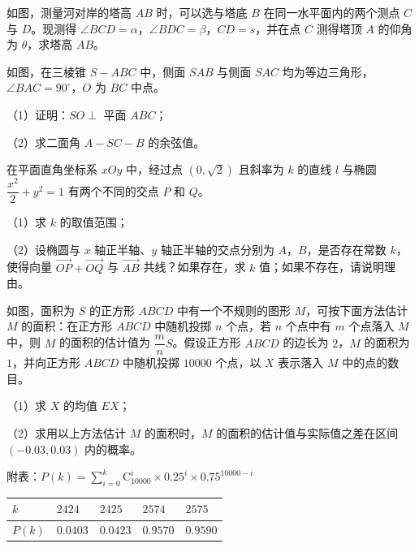 \Needspace{0.4\textheight}
\begin{question}
如图，测量河对岸的塔高 $AB$ 时，可以选与塔底 $B$ 在同一水平面内的两个测点 $C$ 与 $D$。现测得 $\angle BCD=\alpha$，$\angle BDC=\beta$，$CD=s$，并在点 $C$ 测得塔顶 $A$ 的仰角为 $\theta$，求塔高 $AB$。
\nopagebreak[4]
\begin{center}\end{center}
\nopagebreak[4]
\Needspace{0.4\textheight}
\end{question}
\begin{question}
如图，在三棱锥 $S-ABC$ 中，侧面 $SAB$ 与侧面 $SAC$ 均为等边三角形，$\angle BAC=90^\circ$，$O$ 为 $BC$ 中点。

（1）证明：$SO\perp$ 平面 $ABC$；

（2）求二面角 $A-SC-B$ 的余弦值。
\nopagebreak[4]
\begin{center}\end{center}
\nopagebreak[4]
\end{question}
\begin{question}
在平面直角坐标系 $xOy$ 中，经过点 $(0,\sqrt2)$ 且斜率为 $k$ 的直线 $l$ 与椭圆 $\dfrac{x^2}{2}+y^2=1$ 有两个不同的交点 $P$ 和 $Q$。

（1）求 $k$ 的取值范围；

（2）设椭圆与 $x$ 轴正半轴、$y$ 轴正半轴的交点分别为 $A$，$B$，是否存在常数 $k$，使得向量 $\overrightarrow{OP}+\overrightarrow{OQ}$ 与 $\overrightarrow{AB}$ 共线？如果存在，求 $k$ 值；如果不存在，请说明理由。

\Needspace{0.4\textheight}
\end{question}
\begin{question}
如图，面积为 $S$ 的正方形 $ABCD$ 中有一个不规则的图形 $M$，可按下面方法估计 $M$ 的面积：在正方形 $ABCD$ 中随机投掷 $n$ 个点，若 $n$ 个点中有 $m$ 个点落入 $M$ 中，则 $M$ 的面积的估计值为 $\dfrac mnS$。假设正方形 $ABCD$ 的边长为 $2$，$M$ 的面积为 $1$，并向正方形 $ABCD$ 中随机投掷 $10000$ 个点，以 $X$ 表示落入 $M$ 中的点的数目。

（1）求 $X$ 的均值 $EX$；

（2）求用以上方法估计 $M$ 的面积时，$M$ 的面积的估计值与实际值之差在区间 $(-0.03,\allowbreak 0.03)$ 内的概率。

附表：$P(k)=\sum\limits_{i=0}^{k}\mathrm C_{10000}^i\times0.25^i\times0.75^{10000-i}$

\begin{center}
\begin{tabular}{lllll}
\toprule
$k$ & $2424$ & $2425$ & $2574$ & $2575$ \\
\midrule
$P(k)$ & $0.0403$ & $0.0423$ & $0.9570$ & $0.9590$ \\
\bottomrule
\end{tabular}
\end{center}
\nopagebreak[4]
\begin{center}\end{center}
\nopagebreak[4]
\end{question}
